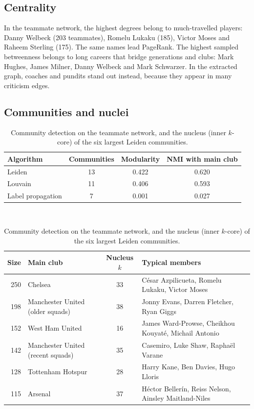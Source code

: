\documentclass[11pt]{article}
\begin{document}
\subsection{Centrality}
In the teammate network, the highest degrees belong to much-travelled players: Danny Welbeck (203 teammates), Romelu Lukaku (185), Victor Moses and Raheem Sterling (175). The same names lead PageRank. The highest sampled betweenness belongs to long careers that bridge generations and clubs: Mark Hughes, James Milner, Danny Welbeck and Mark Schwarzer. In the extracted graph, coaches and pundits stand out instead, because they appear in many criticism edges.

\subsection{Communities and nuclei}
\begin{table}[t]\centering\small
\caption{Community detection on the teammate network, and the nucleus (inner $k$-core) of the six largest Leiden communities.}
\label{tab:communities}
\begin{tabular}{@{}lccc@{}}\toprule
Algorithm & Communities & Modularity & NMI with main club\\\midrule
Leiden & 13 & 0.422 & 0.620\\
Louvain & 11 & 0.406 & 0.593\\
Label propagation & 7 & 0.001 & 0.027\\\bottomrule
\end{tabular}\\[0.6em]
\begin{tabular}{@{}rlcl@{}}\toprule
Size & Main club & Nucleus $k$ & Typical members\\\midrule
250 & Chelsea & 33 & César Azpilicueta, Romelu Lukaku, Victor Moses\\
198 & Manchester United (older squads) & 38 & Jonny Evans, Darren Fletcher, Ryan Giggs\\
152 & West Ham United & 16 & James Ward-Prowse, Cheikhou Kouyaté, Michail Antonio\\
142 & Manchester United (recent squads) & 35 & Casemiro, Luke Shaw, Raphaël Varane\\
128 & Tottenham Hotspur & 28 & Harry Kane, Ben Davies, Hugo Lloris\\
115 & Arsenal & 37 & Héctor Bellerín, Reiss Nelson, Ainsley Maitland-Niles\\\bottomrule
\end{tabular}
\end{table}
\end{document}

